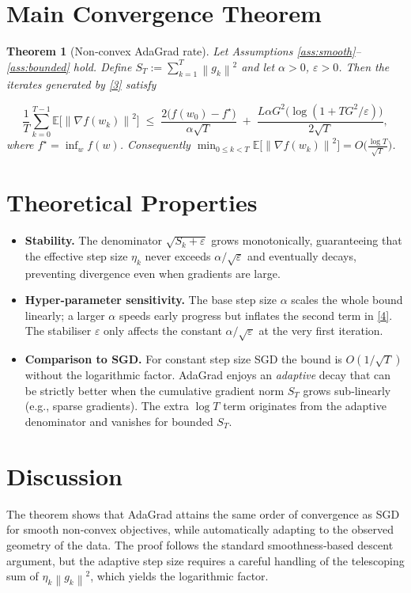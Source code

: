 \documentclass{article}
\newtheorem{theorem}{Theorem}
\newcommand{\E}{\mathbb{E}}
\newcommand{\norm}[1]{\left\lVert#1\right\rVert}
\begin{document}
\section*{Main Convergence Theorem}
\begin{theorem}[Non‑convex AdaGrad rate]\label{thm:main}
Let Assumptions \ref{ass:smooth}–\ref{ass:bounded} hold.  
Define $S_T:=\sum_{k=1}^{T}\norm{g_k}^{2}$ and let $\alpha>0$, $\varepsilon>0$.  
Then the iterates generated by \eqref{3} satisfy  

\[
\frac{1}{T}\sum_{k=0}^{T-1}\E\!\big[\norm{\nabla f(w_k)}^{2}\big]
\;\le\;
\frac{2\big(f(w_0)-f^{\star}\big)}{\alpha\sqrt{T}}
\;+\;
\frac{L\alpha G^{2}\big(\log (1+T G^{2}/\varepsilon)\big)}{2\sqrt{T}},
\tag{4}
\]
where $f^{\star}= \inf_{w}f(w)$.  
Consequently $\displaystyle\min_{0\le k<T}\E\!\big[\norm{\nabla f(w_k)}^{2}\big]=O\!\big(\tfrac{\log T}{\sqrt{T}}\big)$.
\end{theorem}

\section*{Theoretical Properties}
\begin{itemize}[leftmargin=*]
\item \textbf{Stability.} The denominator $\sqrt{S_k+\varepsilon}$ grows monotonically, guaranteeing that the effective step size $\eta_k$ never exceeds $\alpha/\sqrt{\varepsilon}$ and eventually decays, preventing divergence even when gradients are large.
\item \textbf{Hyper‑parameter sensitivity.} The base step size $\alpha$ scales the whole bound linearly; a larger $\alpha$ speeds early progress but inflates the second term in \eqref{4}. The stabiliser $\varepsilon$ only affects the constant $\alpha/\sqrt{\varepsilon}$ at the very first iteration.
\item \textbf{Comparison to SGD.} For constant step size SGD the bound is $O(1/\sqrt{T})$ without the logarithmic factor. AdaGrad enjoys an \emph{adaptive} decay that can be strictly better when the cumulative gradient norm $S_T$ grows sub‑linearly (e.g., sparse gradients). The extra $\log T$ term originates from the adaptive denominator and vanishes for bounded $S_T$.
\end{itemize}

\section*{Discussion}
The theorem shows that AdaGrad attains the same order of convergence as SGD for smooth non‑convex objectives, while automatically adapting to the observed geometry of the data. The proof follows the standard smoothness‑based descent argument, but the adaptive step size requires a careful handling of the telescoping sum of $\eta_k\norm{g_k}^{2}$, which yields the logarithmic factor.
\end{document}
